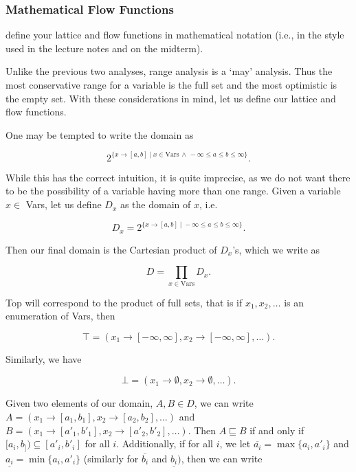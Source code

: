 \documentclass{article}
\theoremstyle{definition}
\begin{document}
\subsubsection{Mathematical Flow Functions}

\begin{framed}
  define your lattice and flow functions in mathematical notation
  (i.e., in the style used in the lecture notes and on the midterm).
\end{framed}

Unlike the previous two analyses, range analysis is a `may' analysis. Thus the most conservative range for a variable is the full set and the most optimistic is the empty set. With these considerations in mind, let us define our lattice and flow functions. 

One may be tempted to write the domain as

\[ 2^{ \{ x \rightarrow [a , b] \; | \; x \in \text{Vars} \, \wedge \, -\infty \leq a \leq b \leq \infty \} }.  \]

While this has the correct intuition, it is quite imprecise, as we do not want there to be the possibility of a variable having more than one range. Given a variable $x \in$ Vars, let us define $D_x$ as the domain of $x$, i.e. 

\[ D_x =  2^{ \{ x \rightarrow [a , b] \; | \;  -\infty \leq a \leq b \leq \infty \} }. \]

Then our final domain is the Cartesian product of $D_x$'s, which we write as

\[ D = \prod_{x \in \text{Vars}} D_x. \]

Top will correspond to the product of full sets, that is if $x_1, x_2, \ldots$ is an enumeration of Vars, then

\[  \top = (x_1 \rightarrow [-\infty, \infty], x_2 \rightarrow [-\infty, \infty], \ldots). \]

Similarly, we have

\[ \bot =  (x_1 \rightarrow \emptyset , x_2 \rightarrow \emptyset, \ldots). \]

Given two elements of our domain, $A, B \in D$, we can write $A = (x_1 \rightarrow [a_1, b_1] , x_2 \rightarrow [a_2, b_2], \ldots)$ and $B = (x_1 \rightarrow [a'_1, b'_1] , x_2 \rightarrow [a'_2, b'_2], \ldots)$. Then $A \sqsubseteq B$ if and only if $[a_i, b_]) \subseteq [a'_i, b'_i]$ for all $i$. Additionally, if for all $i$, we let $\overline{a_i} = \max \{ a_i, a'_i \}$ and $\underline{a_i} = \min \{ a_i, a'_i \}$ (similarly for $\overline{b_i}$ and $\underline{b_i})$, then we can write
\end{document}
